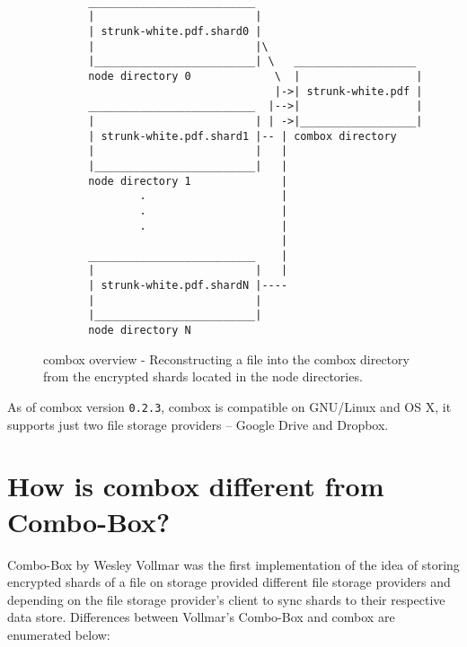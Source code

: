 \begin{figure}[h]
\begin{verbatim}

       __________________________
       |                         |
       | strunk-white.pdf.shard0 |
       |                         |\
       |_________________________| \   ___________________
       node directory 0             \  |                  |
                                    |->| strunk-white.pdf |
       __________________________  |-->|                  |
       |                         | | ->|__________________|
       | strunk-white.pdf.shard1 |-- | combox directory
       |                         |   |
       |_________________________|   |
       node directory 1              |
               .                     |
               .                     |
               .                     |
                                     |
       __________________________    |
       |                         |   |
       | strunk-white.pdf.shardN |----
       |                         |
       |_________________________|
       node directory N

\end{verbatim}
  \caption{combox overview - Reconstructing a file into the combox
    directory from the encrypted shards located in the node
    directories.}
\label{fig:1-combox-overview-1}
\end{figure}

As of combox version \verb+0.2.3+, combox is compatible on GNU/Linux
and OS X, it supports just two file storage providers -- Google Drive
and Dropbox.

\section{How is combox different from Combo-Box?}\label{1-sec-cb-diff}

Combo-Box by Wesley Vollmar\cite{vollmar-combo-box} was the first
implementation of the idea of storing encrypted shards of a file on
storage provided different file storage providers and depending on the
file storage provider's client to sync shards to their respective data
store. Differences between Vollmar's Combo-Box and combox are
enumerated below:

